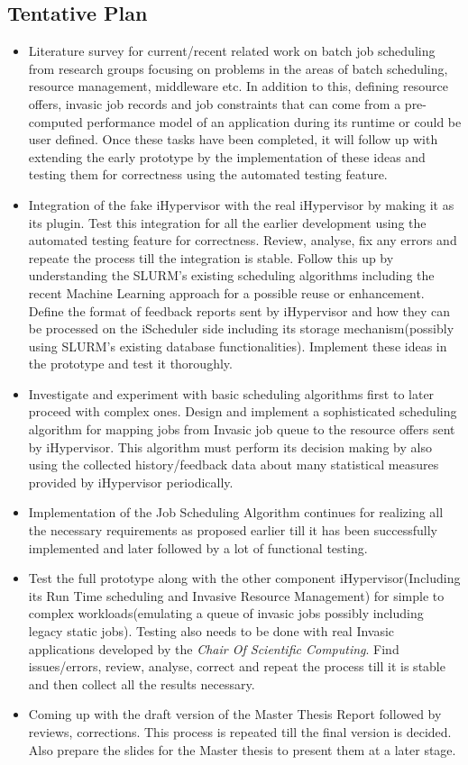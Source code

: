 \documentclass{article}
\begin{document}
\subsection{Tentative Plan}
\begin{itemize}
\item Literature survey for current/recent related work on batch job scheduling from research groups focusing on problems in the areas of batch scheduling, resource management, middleware etc. In addition to this, defining resource offers, invasic job records and job constraints that can come from a pre-computed performance model of an application during its runtime or could be user defined. Once these tasks have been completed, it will follow up with extending the early prototype by the implementation of these ideas and testing them for correctness using the automated testing feature.
\item Integration of the fake iHypervisor with the real iHypervisor by making it as its plugin. Test this integration for all the earlier development using the automated testing feature for correctness. Review, analyse, fix any errors and repeate the process till the integration is stable. Follow this up by understanding the SLURM's existing scheduling algorithms including the recent Machine Learning approach for a possible reuse or enhancement. Define the format of feedback reports sent by iHypervisor and how they can be processed on the iScheduler side including its storage mechanism(possibly using SLURM's existing database functionalities). Implement these ideas in the prototype and test it thoroughly.
\item Investigate and experiment with basic scheduling algorithms first to later proceed with complex ones. Design and implement a sophisticated scheduling algorithm for mapping jobs from Invasic job queue to the resource offers sent by iHypervisor. This algorithm must perform its decision making by also using the collected history/feedback data about many statistical measures provided by iHypervisor periodically. 
\item Implementation of the Job Scheduling Algorithm continues for realizing all the necessary requirements as proposed earlier till it has been successfully implemented and later followed by a lot of functional testing.
\item Test the full prototype along with the other component iHypervisor(Including its Run Time scheduling and Invasive Resource Management) for simple to complex workloads(emulating a queue of invasic jobs possibly including legacy static jobs). Testing also needs to be done with real Invasic applications developed by the \textit{Chair Of Scientific Computing}. Find issues/errors, review, analyse, correct and repeat the process till it is stable and then collect all the results necessary.
\item Coming up with the draft version of the Master Thesis Report followed by reviews, corrections. This process is repeated till the final version is decided. Also prepare the slides for the Master thesis to present them at a later stage.
\end{itemize}
\end{document}
